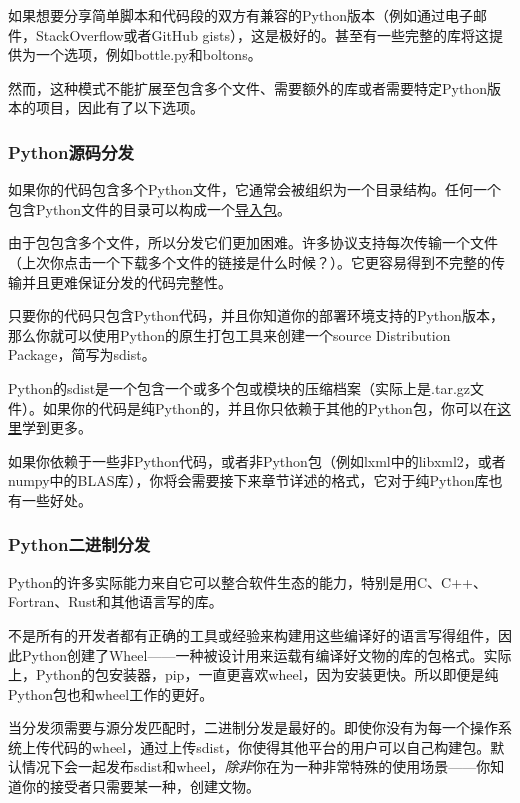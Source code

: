 \documentclass[../package_tutorial.tex]{subfiles}
\begin{document}
如果想要分享简单脚本和代码段的双方有兼容的Python版本（例如通过电子邮件，StackOverflow或者GitHub gists），这是极好的。甚至有一些完整的库将这提供为一个选项，例如bottle.py和boltons。

然而，这种模式不能扩展至包含多个文件、需要额外的库或者需要特定Python版本的项目，因此有了以下选项。

\subsubsection{Python源码分发}

如果你的代码包含多个Python文件，它通常会被组织为一个目录结构。任何一个包含Python文件的目录可以构成一个\href{https://packaging.python.org/glossary/#term-Import-Package}{导入包}。

由于包包含多个文件，所以分发它们更加困难。许多协议支持每次传输一个文件（上次你点击一个下载多个文件的链接是什么时候？）。它更容易得到不完整的传输并且更难保证分发的代码完整性。

只要你的代码只包含Python代码，并且你知道你的部署环境支持的Python版本，那么你就可以使用Python的原生打包工具来创建一个source Distribution Package，简写为sdist。

Python的sdist是一个包含一个或多个包或模块的压缩档案（实际上是.tar.gz文件）。如果你的代码是纯Python的，并且你只依赖于其他的Python包，你可以在\href{https://docs.python.org/3/distutils/sourcedist.html}{这里}学到更多。

如果你依赖于一些非Python代码，或者非Python包（例如lxml中的libxml2，或者numpy中的BLAS库），你将会需要接下来章节详述的格式，它对于纯Python库也有一些好处。

\subsubsection{Python二进制分发}

Python的许多实际能力来自它可以整合软件生态的能力，特别是用C、C++、Fortran、Rust和其他语言写的库。

不是所有的开发者都有正确的工具或经验来构建用这些编译好的语言写得组件，因此Python创建了Wheel——一种被设计用来运载有编译好文物的库的包格式。实际上，Python的包安装器，pip，一直更喜欢wheel，因为安装更快。所以即便是纯Python包也和wheel工作的更好。

当分发须需要与源分发匹配时，二进制分发是最好的。即使你没有为每一个操作系统上传代码的wheel，通过上传sdist，你使得其他平台的用户可以自己构建包。默认情况下会一起发布sdist和wheel，\textit{除非}你在为一种非常特殊的使用场景——你知道你的接受者只需要某一种，创建文物。
\end{document}
